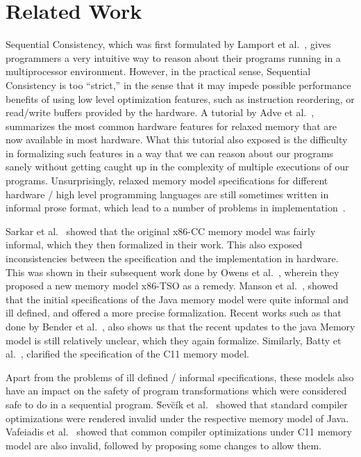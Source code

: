 \section{Related Work}
   Sequential Consistency, which was first formulated by Lamport et al.~\cite{Lamport79}, gives programmers a very intuitive way to reason about their programs running in a multiprocessor environment.
   However, in the practical sense, Sequential Consistency is too ``strict,'' in the sense that it may impede possible performance benefits of using low
   level optimization features, such as instruction reordering, or read/write buffers provided by the hardware.
   A tutorial by Adve et al.~\cite{AdveG}, summarizes the most common hardware features for relaxed memory that are now available in most hardware. What this tutorial also exposed is the difficulty in formalizing such features in a way that we can reason about our programs sanely without getting caught up in the complexity of multiple executions of our programs. 
   Unsurprisingly, relaxed memory model specifications for different hardware / high level programming languages are still sometimes written in informal prose format, which lead to a number of problems in implementation~\cite{Sewell}. 
   
   Sarkar et al.~\cite{SarkarS} showed that the original x86-CC memory model was fairly informal, which they then formalized in their work. This also exposed inconsistencies between the specification and the implementation in hardware. This was shown in their subsequent work done by Owens et al.~\cite{OwensS}, wherein they proposed a new memory model x86-TSO as a remedy. 
   Manson et al.~\cite{JeremyM}, showed that the initial specifications of the Java memory model were quite informal and ill defined, and offered a more precise formalization. Recent works such as that done by Bender et al.~\cite{BenderJ}, also shows us that the recent updates to the java Memory model is still relatively unclear, which they again formalize. Similarly, 
   Batty et al.~\cite{BattyM}, clarified the specification of the C11 memory model. 
   
   Apart from the problems of ill defined / informal specifications, these models also have an impact on the safety of program transformations which were considered safe to do in a sequential program. \u{S}ev\u{c}\'{i}k et al.~\cite{SevcikJ} showed that standard compiler optimizations were rendered invalid under the respective memory model of Java. Vafeiadis et al.~\cite{VafeiadisV} showed that common compiler optimizations under C11 memory model are also invalid, followed by proposing some changes to allow them. 
   
